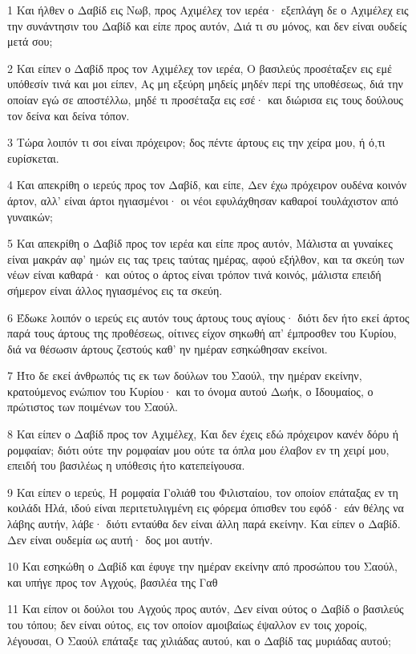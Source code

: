 \par 1 Και ήλθεν ο Δαβίδ εις Νωβ, προς Αχιμέλεχ τον ιερέα· εξεπλάγη δε ο Αχιμέλεχ εις την συνάντησιν του Δαβίδ και είπε προς αυτόν, Διά τι συ μόνος, και δεν είναι ουδείς μετά σου;
\par 2 Και είπεν ο Δαβίδ προς τον Αχιμέλεχ τον ιερέα, Ο βασιλεύς προσέταξεν εις εμέ υπόθεσίν τινά και μοι είπεν, Ας μη εξεύρη μηδείς μηδέν περί της υποθέσεως, διά την οποίαν εγώ σε αποστέλλω, μηδέ τι προσέταξα εις εσέ· και διώρισα εις τους δούλους τον δείνα και δείνα τόπον.
\par 3 Τώρα λοιπόν τι σοι είναι πρόχειρον; δος πέντε άρτους εις την χείρα μου, ή ό,τι ευρίσκεται.
\par 4 Και απεκρίθη ο ιερεύς προς τον Δαβίδ, και είπε, Δεν έχω πρόχειρον ουδένα κοινόν άρτον, αλλ' είναι άρτοι ηγιασμένοι· οι νέοι εφυλάχθησαν καθαροί τουλάχιστον από γυναικών;
\par 5 Και απεκρίθη ο Δαβίδ προς τον ιερέα και είπε προς αυτόν, Μάλιστα αι γυναίκες είναι μακράν αφ' ημών εις τας τρεις ταύτας ημέρας, αφού εξήλθον, και τα σκεύη των νέων είναι καθαρά· και ούτος ο άρτος είναι τρόπον τινά κοινός, μάλιστα επειδή σήμερον είναι άλλος ηγιασμένος εις τα σκεύη.
\par 6 Έδωκε λοιπόν ο ιερεύς εις αυτόν τους άρτους τους αγίους· διότι δεν ήτο εκεί άρτος παρά τους άρτους της προθέσεως, οίτινες είχον σηκωθή απ' έμπροσθεν του Κυρίου, διά να θέσωσιν άρτους ζεστούς καθ' ην ημέραν εσηκώθησαν εκείνοι.
\par 7 Ήτο δε εκεί άνθρωπός τις εκ των δούλων του Σαούλ, την ημέραν εκείνην, κρατούμενος ενώπιον του Κυρίου· και το όνομα αυτού Δωήκ, ο Ιδουμαίος, ο πρώτιστος των ποιμένων του Σαούλ.
\par 8 Και είπεν ο Δαβίδ προς τον Αχιμέλεχ, Και δεν έχεις εδώ πρόχειρον κανέν δόρυ ή ρομφαίαν; διότι ούτε την ρομφαίαν μου ούτε τα όπλα μου έλαβον εν τη χειρί μου, επειδή του βασιλέως η υπόθεσις ήτο κατεπείγουσα.
\par 9 Και είπεν ο ιερεύς, Η ρομφαία Γολιάθ του Φιλισταίου, τον οποίον επάταξας εν τη κοιλάδι Ηλά, ιδού είναι περιτετυλιγμένη εις φόρεμα όπισθεν του εφόδ· εάν θέλης να λάβης αυτήν, λάβε· διότι ενταύθα δεν είναι άλλη παρά εκείνην. Και είπεν ο Δαβίδ. Δεν είναι ουδεμία ως αυτή· δος μοι αυτήν.
\par 10 Και εσηκώθη ο Δαβίδ και έφυγε την ημέραν εκείνην από προσώπου του Σαούλ, και υπήγε προς τον Αγχούς, βασιλέα της Γαθ
\par 11 Και είπον οι δούλοι του Αγχούς προς αυτόν, Δεν είναι ούτος ο Δαβίδ ο βασιλεύς του τόπου; δεν είναι ούτος, εις τον οποίον αμοιβαίως έψαλλον εν τοις χοροίς, λέγουσαι, Ο Σαούλ επάταξε τας χιλιάδας αυτού, και ο Δαβίδ τας μυριάδας αυτού;
